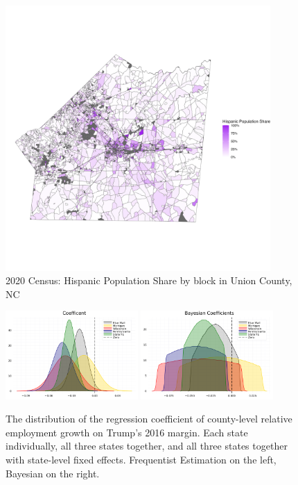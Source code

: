\documentclass[11pt]{article}
\begin{document}
\begin{figure}
   \centering
   \includegraphics[width=0.9\textwidth]{plots/union_nc.png}
   \caption{2020 Census: Hispanic Population Share by block in Union County, NC}
\end{figure}
\begin{figure}
    \centering
    \includegraphics[width=0.45\textwidth]{plots/frequentist-coefs.png}
    \hfill 
    \includegraphics[width=0.45\textwidth]{plots/bayesian-corr-coefs.png}
    \caption{The distribution of the regression coefficient of county-level relative employment growth on Trump's 2016 margin. Each state individually, all three states together, and all three states together with state-level fixed effects. Frequentist Estimation on the left, Bayesian on the right.}
\end{figure}
\end{document}
